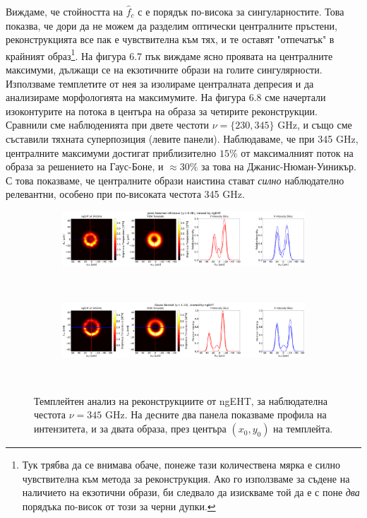 \documentclass[12pt]{article}
\numberwithin{equation}{section}
\numberwithin{figure}{section}
\begin{document}
	 \newpage
	Виждаме, че стойността на $\hat{f}_c$ с е порядък по-висока за сингуларностите. Това показва, че дори да не можем да разделим оптически централните пръстени, реконструкцията все пак е чувствителна към тях, и те оставят "отпечатък" в крайният образ\footnote{Тук трябва да се внимава обаче, понеже тази количествена мярка е силно чувствителна към метода за реконструкция. Ако го използваме за съдене на наличието на екзотични образи, би следвало да изискваме той да е с поне \emph{два} порядъка по-висок от този за черни дупки.}. На фигура 6.7 пък виждаме ясно проявата на централните максимуми, дължащи се на екзотичните образи на голите сингулярности. Използваме темплетите от нея за изолираме централната депресия и да анализираме морфологията на максимумите. На фигура 6.8 сме начертали изоконтурите на потока в центъра на образа за четирите реконструкции. Сравнили сме наблюденията при двете честоти $\nu = \{230, 345\}$ GHz, и също сме съставили тяхната суперпозиция (левите панели). Наблюдаваме, че при 345 GHz, централните максимуми достигат приблизително $15\%$ от максималният поток на образа за решението на Гаус-Боне, и $\approx 30\%$ за това на Джанис-Нюман-Уиникър. С това показваме, че централните образи наистина стават \emph{силно} наблюдателно релевантни, особено при по-високата честота 345 GHz. 
	 
	 \begin{figure}[h!]
	 	\centering
	 	\begin{subfigure}{12cm}
	 		\hspace{-1.5cm}
	 		\includegraphics[scale = 0.13]{Section_8_Observing_Horizonless_Objects/Ehtim_Vida_plot_ngEHT_345_JNW.png}
	 	\end{subfigure}\\
	 	\begin{subfigure}{12cm}
	 		\hspace{-1.5cm}
	 		\includegraphics[scale = 0.13]{Section_8_Observing_Horizonless_Objects/Ehtim_Vida_plot_ngEHT_345_GB.png}
	 	\end{subfigure}\\
	 	\label{VIDA_ngEHT_230}
	 	\caption[Темплейтен анализ на реконструкциите от ngEHT за $\nu= 345$ GHz]{\small Темплейтен анализ на реконструкциите от ngEHT, за наблюдателна честота $\nu = 345$ GHz. На десните два панела показваме профила на интензитета, и за двата образа, през центъра $(x_0,y_0)$ на темплейта.} 
	 \end{figure}
	 
\end{document}
